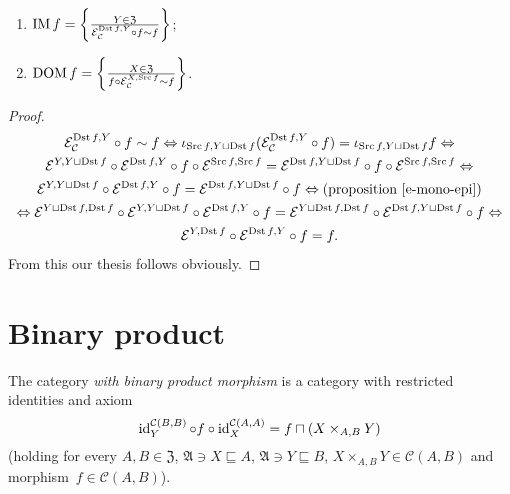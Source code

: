 \begin{prop}
~
\begin{enumerate}
\item $\operatorname{IM} f = \left\{ \frac{Y \in \mathfrak{Z}}{
  \mathcal{E}_{\mathcal{C}}^{\operatorname{Dst} f, Y} \circ f \sim f}\right\}$;
\item $\operatorname{DOM} f = \left\{ \frac{X \in \mathfrak{Z}}{
  f\circ\mathcal{E}_{\mathcal{C}}^{X, \operatorname{Src} f} \sim f}\right\}$.
\end{enumerate}
\end{prop}

\begin{proof}
~
\begin{multline*}
\mathcal{E}_{\mathcal{C}}^{\operatorname{Dst} f, Y} \circ f \sim f
\Leftrightarrow
\iota_{\operatorname{Src} f,Y\sqcup\operatorname{Dst} f}
(\mathcal{E}_{\mathcal{C}}^{\operatorname{Dst} f, Y} \circ f) =
\iota_{\operatorname{Src} f,Y\sqcup\operatorname{Dst} f}f \Leftrightarrow \\
\mathcal{E}^{Y,Y\sqcup\operatorname{Dst} f}\circ\mathcal{E}^{\operatorname{Dst} f, Y} \circ f \circ \mathcal{E}^{\operatorname{Src} f,\operatorname{Src} f} =
\mathcal{E}^{\operatorname{Dst} f,Y\sqcup\operatorname{Dst} f}\circ f\circ\mathcal{E}^{\operatorname{Src} f,\operatorname{Src} f} \Leftrightarrow \\
\mathcal{E}^{Y,Y\sqcup\operatorname{Dst} f}\circ\mathcal{E}^{\operatorname{Dst} f, Y}\circ f=\mathcal{E}^{\operatorname{Dst} f,Y\sqcup\operatorname{Dst} f}\circ f
\Leftrightarrow \text{(proposition~\ref{e-mono-epi})} \\ \Leftrightarrow
\mathcal{E}^{Y\sqcup\operatorname{Dst} f,\operatorname{Dst} f}\circ \mathcal{E}^{Y,Y\sqcup\operatorname{Dst} f}\circ\mathcal{E}^{\operatorname{Dst} f, Y}\circ f=\mathcal{E}^{Y\sqcup\operatorname{Dst} f,\operatorname{Dst} f}\circ \mathcal{E}^{\operatorname{Dst} f,Y\sqcup\operatorname{Dst} f}\circ f \Leftrightarrow \\
\mathcal{E}^{Y,\operatorname{Dst} f}\circ\mathcal{E}^{\operatorname{Dst} f,Y}\circ f = f.
\end{multline*}
From this our thesis follows obviously.
\end{proof}

\section{Binary product}

\begin{defn}
The category \emph{with binary product morphism}
is a category with restricted identities and axiom
\[\operatorname{id}^{\mathcal{C}(B,B)}_Y\circ f\circ\operatorname{id}^{\mathcal{C}(A,A)}_X=f\sqcap(X\times_{A,B}Y)\]
(holding for every $A,B\in\mathfrak{Z}$,
$\mathfrak{A}\ni X\sqsubseteq A$,
$\mathfrak{A}\ni Y\sqsubseteq B$,
$X\times_{A,B}Y\in\mathcal{C}(A,B)$
and morphism~$f\in\mathcal{C}(A,B)$).
\end{defn}


